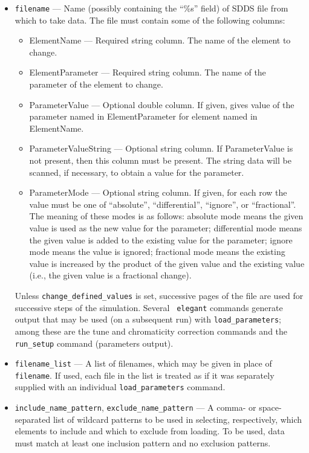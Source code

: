 \documentclass[11pt]{article}
\begin{document}
\begin{itemize}
\item \verb|filename| --- Name (possibly containing the ``\%s'' field) 
of SDDS file from which to take data.  The file
must contain some of the following columns:
\begin{itemize}
\item ElementName --- Required string column.  The name of the element to change.
\item ElementParameter --- Required string column.  The name of the parameter of the element to change.
\item ParameterValue --- Optional double column.  If given, gives value of the parameter named
 in ElementParameter for element named in ElementName.
\item ParameterValueString --- Optional string column.  If ParameterValue is not present, then
this column must be present.  The string data will be scanned, if necessary,
to obtain a value for the parameter.
\item ParameterMode --- Optional string column.  If given, for each row the value must be
one of ``absolute'', ``differential'', ``ignore'', or ``fractional''.  The meaning of these
modes is as follows: absolute mode means the given value is used as the new value for
the parameter; differential mode means the given value is added to the existing value
for the parameter; ignore mode means the value is ignored; fractional mode means the
existing value is increased by the product of the given value and the existing value 
(i.e., the given value is a fractional change).
\end{itemize}

Unless \verb|change_defined_values| is set, successive pages of the
file are used for successive steps of the simulation.  Several {\tt
elegant} commands generate output that may be used (on a subsequent
run) with \verb|load_parameters|; among these are the tune and
chromaticity correction commands and the \verb|run_setup| command
(parameters output).

\item \verb|filename_list| --- A list of filenames, which may be 
        given in place of \verb|filename|.  If used, each file
        in the list is treated as if it was separately supplied
        with an individual \verb|load_parameters| command.

\item \verb|include_name_pattern|, \verb|exclude_name_pattern| ---
A comma- or space-separated list of wildcard patterns to be used in selecting, respectively, which
elements to include and which to exclude from loading. 
To be used, data must match at least one inclusion pattern and no exclusion patterns.


\end{itemize}
\end{document}
